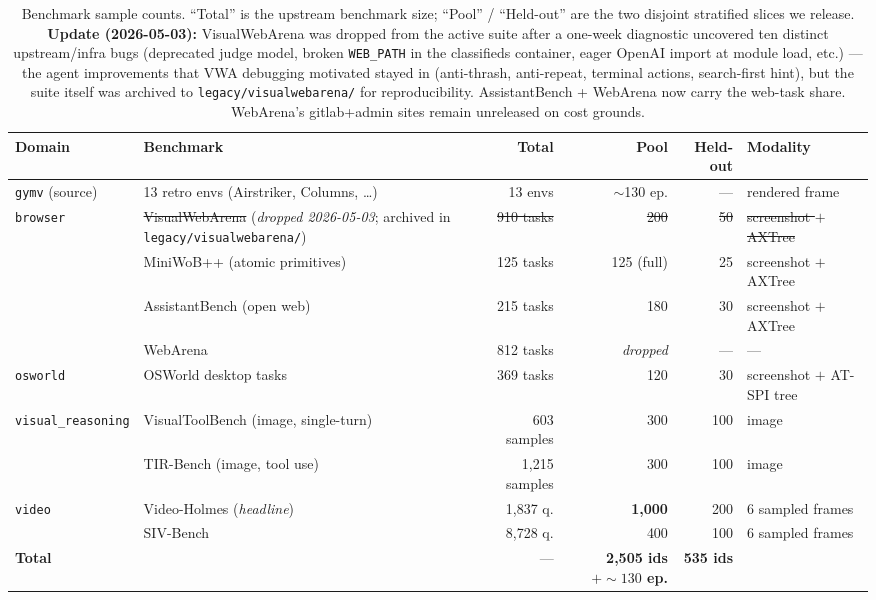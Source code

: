 \begin{table}[t]
\centering
\small
\caption{Benchmark sample counts. ``Total'' is the upstream benchmark
size; ``Pool'' / ``Held-out'' are the two disjoint stratified slices we
release. \textbf{Update (2026-05-03):} VisualWebArena was dropped
from the active suite after a one-week diagnostic uncovered ten
distinct upstream/infra bugs (deprecated judge model, broken
\texttt{WEB\_PATH} in the classifieds container, eager OpenAI
import at module load, etc.) — the agent improvements that VWA
debugging motivated stayed in (anti-thrash, anti-repeat, terminal
actions, search-first hint), but the suite itself was archived to
\texttt{legacy/visualwebarena/} for reproducibility. AssistantBench
+ WebArena now carry the web-task share. WebArena's gitlab+admin
sites remain unreleased on cost grounds.}
\label{tab:bench-sizes}
\renewcommand{\arraystretch}{1.10}
\begin{tabular}{@{}llrrrl@{}}
\toprule
\textbf{Domain} & \textbf{Benchmark} & \textbf{Total} & \textbf{Pool} & \textbf{Held-out} & \textbf{Modality} \\
\midrule
\multirow{1}{*}{\texttt{gymv} (source)}
  & 13 retro envs (Airstriker, Columns, \ldots) & 13 envs        & $\sim$130 ep.        & ---  & rendered frame \\
\midrule
\multirow{4}{*}{\texttt{browser}}
  & \st{VisualWebArena} (\emph{dropped 2026-05-03}; archived in \texttt{legacy/visualwebarena/}) & \st{910 tasks} & \st{200} & \st{50} & \st{screenshot $+$ AXTree} \\
  & MiniWoB++ (atomic primitives)               & 125 tasks      & 125 (full)           & 25   & screenshot $+$ AXTree \\
  & AssistantBench (open web)                   & 215 tasks      & 180                  & 30   & screenshot $+$ AXTree \\
  & WebArena                                    & 812 tasks      & \emph{dropped}       & ---  & --- \\
\midrule
\texttt{osworld}
  & OSWorld desktop tasks                       & 369 tasks      & 120                  & 30   & screenshot $+$ AT-SPI tree \\
\midrule
\multirow{2}{*}{\texttt{visual\_reasoning}}
  & VisualToolBench (image, single-turn)        & 603 samples    & 300                  & 100  & image \\
  & TIR-Bench (image, tool use)                 & 1{,}215 samples& 300                  & 100  & image \\
\midrule
\multirow{2}{*}{\texttt{video}}
  & Video-Holmes (\emph{headline})              & 1{,}837 q.     & \textbf{1{,}000}     & 200  & 6 sampled frames \\
  & SIV-Bench                                   & 8{,}728 q.     & 400                  & 100  & 6 sampled frames \\
\midrule
\textbf{Total}    &                              & ---            & \textbf{2{,}505 ids $+\sim\!130$ ep.} & \textbf{535 ids} & \\
\bottomrule
\end{tabular}
\end{table}

